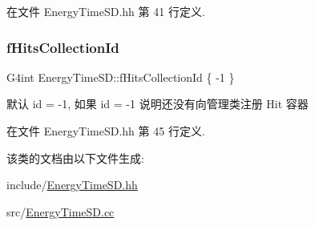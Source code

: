 在文件 Energy\+Time\+S\+D.\+hh 第 41 行定义.

\mbox{\label{classEnergyTimeSD_ad137fb0e308e260e9eb18378cd325a7d}} 
\subsubsection{\texorpdfstring{f\+Hits\+Collection\+Id}{fHitsCollectionId}}
{\footnotesize\ttfamily G4int Energy\+Time\+S\+D\+::f\+Hits\+Collection\+Id \{ -\/1 \}\hspace{0.3cm}{\ttfamily [private]}}



默认 id = -\/1, 如果 id = -\/1 说明还没有向管理类注册 Hit 容器 



在文件 Energy\+Time\+S\+D.\+hh 第 45 行定义.



该类的文档由以下文件生成\+:\begin{DoxyCompactItemize}
\item 
include/\hyperlink{EnergyTimeSD_8hh}{Energy\+Time\+S\+D.\+hh}\item 
src/\hyperlink{EnergyTimeSD_8cc}{Energy\+Time\+S\+D.\+cc}\end{DoxyCompactItemize}
